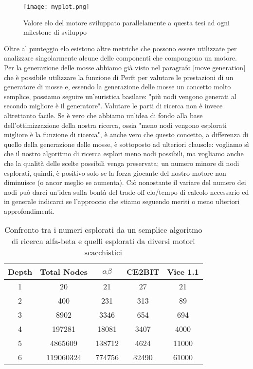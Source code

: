 \begin{figure}[h]
    \centering
    \texttt{[image: myplot.png]}
    \caption{Valore elo del motore sviluppato parallelamente a questa tesi ad ogni milestone di sviluppo}
\end{figure}

Oltre al punteggio elo esistono altre metriche che possono essere utilizzate per analizzare singolarmente alcune delle componenti che compongono un motore.
Per la generazione delle mosse abbiamo già visto nel paragrafo \ref{move generation} che è possibile utilizzare la funzione di Perft per valutare le prestazioni di un generatore di mosse e, essendo la generazione
delle mosse un concetto molto semplice, possiamo seguire un'euristica basilare: "più nodi vengono generati al secondo migliore è il generatore". Valutare le parti 
di ricerca non è invece altrettanto facile. Se è vero che abbiamo un'idea di fondo alla base dell'ottimizzazione della nostra ricerca, ossia "meno nodi vengono esplorati migliore è la funzione di ricerca", è anche vero 
che questo concetto, a differenza di quello della generazione delle mosse, è sottoposto ad ulteriori clausole: vogliamo sì che il nostro algoritmo di ricerca esplori meno nodi possibili, ma vogliamo anche che la qualità
delle scelte possibili venga preservata; un numero minore di nodi esplorati, quindi, è positivo solo se la forza giocante del nostro motore non diminuisce (o ancor meglio se aumenta). Ciò nonostante il variare del numero dei nodi 
può darci un'idea sulla bontà del trade-off elo/tempo di calcolo necessario ed in generale indicarci se l'approccio che stiamo seguendo meriti o meno ulteriori approfondimenti.
\begin{table}[h]
\begin{center}
    \begin{tabular}{|c|c|c|c|c|} 
     \hline
     Depth & Total Nodes  & $\alpha\beta$ & CE2BIT & Vice 1.1 \\ [0.5ex] 
     \hline
     1 & 20  & 21 & 27 & 21 \\ 
     \hline
     2 & 400  &  231 & 313 & 89\\
     \hline
     3 & 8902  &  3346 & 654 & 694 \\
     \hline
     4 & 197281  & 18081 &  3407 & 4000 \\
     \hline
     5 & 4865609  & 138712 & 4624 & 11000 \\ 
     \hline
     6 & 119060324  & 774756 & 32490 & 61000\\
     \hline
    \end{tabular}
    \caption{Confronto tra i numeri esplorati da un semplice algoritmo di ricerca alfa-beta e quelli esplorati da diversi motori scacchistici} \label{tab:sometab}
    \end{center}
\end{table}


